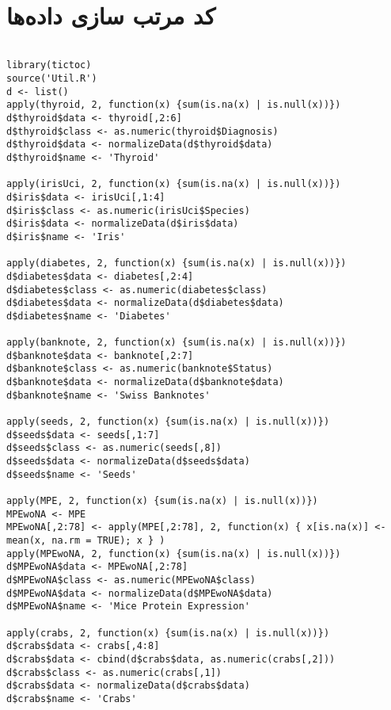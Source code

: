 ‍\section*{
کد مرتب سازی داده‌ها }
\begin{latin}
\begin{Verbatim}[breaklines=true, breakanywhere=true, baselinestretch=1]

library(tictoc)
source('Util.R')
d <- list()
apply(thyroid, 2, function(x) {sum(is.na(x) | is.null(x))})
d$thyroid$data <- thyroid[,2:6]
d$thyroid$class <- as.numeric(thyroid$Diagnosis)
d$thyroid$data <- normalizeData(d$thyroid$data)
d$thyroid$name <- 'Thyroid'

apply(irisUci, 2, function(x) {sum(is.na(x) | is.null(x))})
d$iris$data <- irisUci[,1:4]
d$iris$class <- as.numeric(irisUci$Species)
d$iris$data <- normalizeData(d$iris$data)
d$iris$name <- 'Iris'

apply(diabetes, 2, function(x) {sum(is.na(x) | is.null(x))})
d$diabetes$data <- diabetes[,2:4]
d$diabetes$class <- as.numeric(diabetes$class)
d$diabetes$data <- normalizeData(d$diabetes$data)
d$diabetes$name <- 'Diabetes'

apply(banknote, 2, function(x) {sum(is.na(x) | is.null(x))})
d$banknote$data <- banknote[,2:7]
d$banknote$class <- as.numeric(banknote$Status)
d$banknote$data <- normalizeData(d$banknote$data)
d$banknote$name <- 'Swiss Banknotes'

apply(seeds, 2, function(x) {sum(is.na(x) | is.null(x))})
d$seeds$data <- seeds[,1:7]
d$seeds$class <- as.numeric(seeds[,8])
d$seeds$data <- normalizeData(d$seeds$data)
d$seeds$name <- 'Seeds'

apply(MPE, 2, function(x) {sum(is.na(x) | is.null(x))})
MPEwoNA <- MPE
MPEwoNA[,2:78] <- apply(MPE[,2:78], 2, function(x) { x[is.na(x)] <- mean(x, na.rm = TRUE); x } ) 
apply(MPEwoNA, 2, function(x) {sum(is.na(x) | is.null(x))})
d$MPEwoNA$data <- MPEwoNA[,2:78]
d$MPEwoNA$class <- as.numeric(MPEwoNA$class)
d$MPEwoNA$data <- normalizeData(d$MPEwoNA$data)
d$MPEwoNA$name <- 'Mice Protein Expression'

apply(crabs, 2, function(x) {sum(is.na(x) | is.null(x))})
d$crabs$data <- crabs[,4:8]
d$crabs$data <- cbind(d$crabs$data, as.numeric(crabs[,2]))
d$crabs$class <- as.numeric(crabs[,1])
d$crabs$data <- normalizeData(d$crabs$data)
d$crabs$name <- 'Crabs'

\end{Verbatim}
\end{latin}

